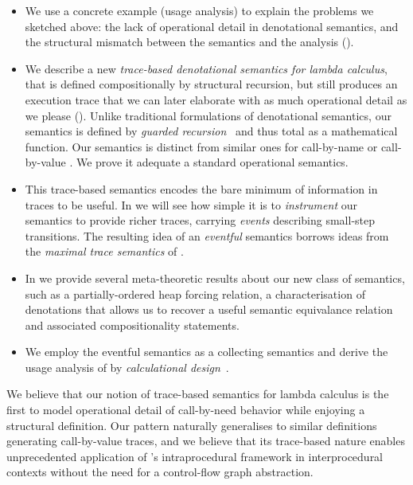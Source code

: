\begin{itemize}
\item We use a concrete example (usage analysis) to explain the problems we sketched
  above: the lack of operational detail in denotational semantics, and the structural mismatch
  between the semantics and the analysis ().
\item We describe a new \emph{trace-based denotational semantics for lambda calculus},
  that is defined compositionally by structural recursion, but still produces an execution
  trace that we can later elaborate with as much operational detail as we please ().
    Unlike traditional formulations of denotational semantics, our semantics
    is defined by \emph{guarded recursion}~\citep{gdtt} and thus total as a
    mathematical function. 
    Our semantics is distinct from similar ones for call-by-name or
    call-by-value .
    We prove it adequate \wrt a standard operational semantics.  
  \item This trace-based semantics encodes the bare minimum of information in traces to be useful.
    In  we will see how simple it is to \emph{instrument} our
    semantics to provide richer traces, carrying \emph{events} describing
    small-step transitions.
    The resulting idea of an \emph{eventful} semantics borrows ideas from the
    \emph{maximal trace semantics} of \citet{Cousot:21}.

  \item In  we provide several meta-theoretic results about our
    new class of semantics, such as a partially-ordered heap forcing relation,
    a characterisation of denotations that allows us to recover a useful
    semantic equivalance relation and associated compositionality statements.
  \item We employ the eventful semantics as a collecting semantics and derive
    the usage analysis of  by \emph{calculational design}~\citep{Cousot:21}.
\end{itemize}
We believe that our notion of trace-based semantics for lambda calculus
is the first to model operational detail of call-by-need behavior while
enjoying a structural definition. Our pattern naturally generalises
to similar definitions generating call-by-value traces, and we believe
that its trace-based nature enables unprecedented application of
\citeauthor{Cousot:21}'s intraprocedural framework in interprocedural
contexts without the need for a control-flow graph abstraction.


